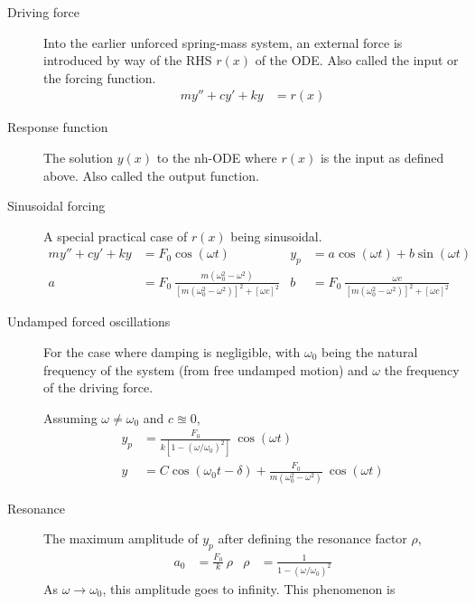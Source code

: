 \begin{description}
    \item[Driving force] Into the earlier unforced spring-mass system, an external force is
        introduced by way of the RHS $ r(x) $ of the ODE. Also called the input or the forcing
        function.
        \begin{align}
            my'' + cy' + ky & = r(x)
        \end{align}
    \item[Response function] The solution $ y(x) $ to the nh-ODE where $ r(x) $ is the
        input as defined above. Also called the output function.
    \item[Sinusoidal forcing] A special practical case of $ r(x) $ being sinusoidal.
        \begin{align}
            my'' + cy' + ky & = F_{0}\cos(\omega t)
                            & y_{p}
                            & = a\cos(\omega t) + b\sin(\omega t)                                                                   \\
            a               & = F_{0}\ \frac{m(\omega_{0}^{2} - \omega^{2})}{[m(\omega_{0}^{2} - \omega^{2})]^{2} + [\omega c]^{2}}
                            & b
                            & = F_{0}\ \frac{\omega c}{[m(\omega_{0}^{2} - \omega^{2})]^{2} + [\omega c]^{2}}
        \end{align}
    \item[Undamped forced oscillations] For the case where damping is negligible, with $ \omega_{0} $
        being the natural frequency of the system (from free undamped motion) and $ \omega $ the
        frequency of the driving force. \par
        Assuming $ \omega \neq \omega_{0} $ and $ c  \approxeq 0 $,
        \begin{align}
            y_{p} & =\frac{F_{0}}{k[1 - (\omega / \omega_{0})^{2}]} \ \cos(\omega t)                              \\
            y     & = C \cos(\omega_{0}t - \delta) + \frac{F_{0}}{m(\omega_{0}^{2} - \omega^{2})}\ \cos(\omega t)
        \end{align}
    \item[Resonance] The maximum amplitude of $ y_{p} $ after defining the resonance factor $ \rho $,
        \begin{align}
            a_{0} & = \frac{F_{0}}{k}\ \rho & \rho & = \frac{1}{1 - (\omega/\omega_{0})^{2}}
        \end{align}
        As $ \omega \rightarrow \omega_{0} $, this amplitude goes to infinity. This phenomenon is

\end{description}
